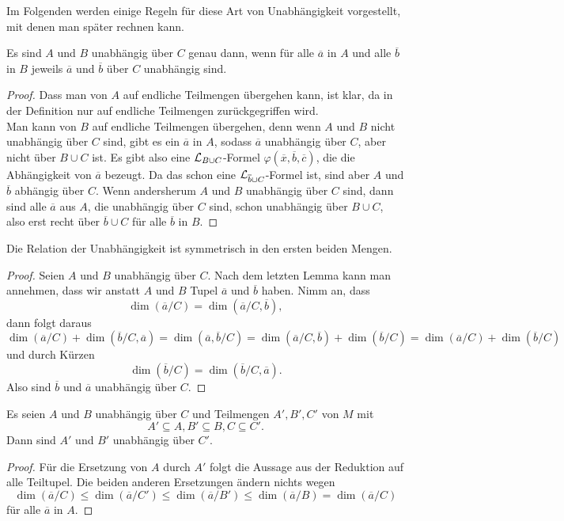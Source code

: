 Im Folgenden werden einige Regeln für diese Art von Unabhängigkeit vorgestellt, mit denen man später \glqq{}rechnen\grqq{} kann.

\begin{lemma}
	Es sind $A$ und $B$ unabhängig über $C$ genau dann, wenn für alle $\overline{a}$ in $A$ und alle $\overline{b}$ in $B$ jeweils $\overline{a}$ und $\overline{b}$ über $C$ unabhängig sind.
\end{lemma}
\begin{proof}
	Dass man von $A$ auf endliche Teilmengen übergehen kann, ist klar, da in der Definition nur auf endliche Teilmengen zurückgegriffen wird.\\
	Man kann von $B$ auf endliche Teilmengen übergehen, denn wenn $A$ und $B$ nicht unabhängig über $C$ sind, gibt es ein $\overline{a}$ in $A$, sodass $\overline{a}$ unabhängig über $C$, aber nicht über $B\cup C$ ist. Es gibt also eine $\mathcal{L}_{B\cup C}$-Formel $\varphi(\overline{x},\overline{b},\overline{c})$, die die Abhängigkeit von $\overline{a}$ bezeugt. Da das schon eine $\mathcal{L}_{\overline{b}\cup C}$-Formel ist, sind aber $A$ und $\overline{b}$ abhängig über $C$. Wenn andersherum $A$ und $B$ unabhängig über $C$ sind, dann sind alle $\overline{a}$ aus $A$, die unabhängig über $C$ sind, schon unabhängig über $B\cup C$, also erst recht über $\overline{b}\cup C$ für alle $\overline{b}$ in $B$.
\end{proof}

\begin{lemma}
	Die Relation der Unabhängigkeit ist symmetrisch in den ersten beiden Mengen.
\end{lemma}
\begin{proof}
	Seien $A$ und $B$ unabhängig über $C$. Nach dem letzten Lemma kann man annehmen, dass wir anstatt $A$ und $B$ Tupel $\overline{a}$ und $\overline{b}$ haben. Nimm an, dass $$\dim(\overline{a}/C)=\dim(\overline{a}/C,\overline{b}),$$
	dann folgt daraus $$\dim(\overline{a}/C)+\dim(\overline{b}/C,\overline{a})=\dim(\overline{a},\overline{b}/C)=\dim(\overline{a}/C,\overline{b})+\dim(\overline{b}/C)=\dim(\overline{a}/C)+\dim(\overline{b}/C)$$ und durch Kürzen $$\dim(\overline{b}/C)=\dim(\overline{b}/C,\overline{a}).$$
	Also sind $\overline{b}$ und $\overline{a}$ unabhängig über $C$.
\end{proof}
\newpage
\begin{lemma}
	Es seien $A$ und $B$ unabhängig über $C$ und Teilmengen $A',B',C'$ von $M$ mit $$A'\subseteq A,B'\subseteq B,C\subseteq C'.$$
	Dann sind $A'$ und $B'$ unabhängig über $C'$.
\end{lemma}
\begin{proof}
	Für die Ersetzung von $A$ durch $A'$ folgt die Aussage aus der Reduktion auf alle Teiltupel. Die beiden anderen Ersetzungen ändern nichts wegen
	$$\dim(\overline{a}/C)\leq\dim(\overline{a}/C')\leq\dim(\overline{a}/B')\leq\dim(\overline{a}/B)=\dim(\overline{a}/C)$$ für alle $\overline{a}$ in $A$.
\end{proof}

